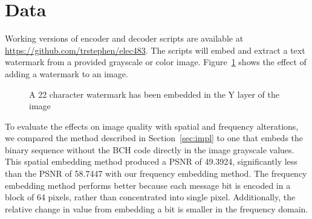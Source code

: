 \section{Data}\label{sec:data}
Working versions of encoder and decoder scripts are available at \url{https://github.com/trstephen/elec483}.
The scripts will embed and extract a text watermark from a provided grayscale or color image.
Figure~\ref{fig:wm} shows the effect of adding a watermark to an image.

\begin{figure}[htpb]
  \centering
  
  \caption{A 22 character watermark has been embedded in the Y layer of the image}
  \label{fig:wm}
\end{figure}

To evaluate the effects on image quality  with spatial and frequency alterations, we compared the method described in Section~\ref{sec:impl} to one that embeds the binary sequence without the BCH code directly in the image grayscale values.
This spatial embedding method produced a PSNR of 49.3924, significantly less than the PSNR of 58.7447 with our frequency embedding method.
The frequency embedding method performs better because each message bit is encoded in a block of 64 pixels, rather than concentrated into single pixel.
Additionally, the relative change in value from embedding a bit is smaller in the frequency domain.

